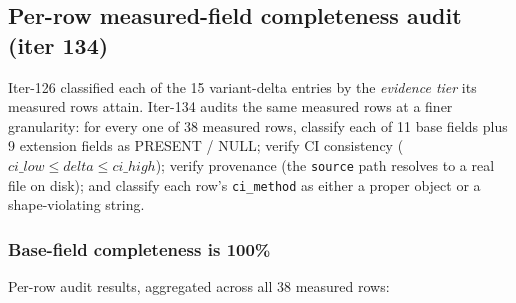 %
%

\subsection{Per-row measured-field completeness audit (iter 134)}
\label{sec:p6-iter134-field-completeness}

Iter-126 classified each of the 15 variant-delta entries by the \emph{evidence
tier} its measured rows attain. Iter-134 audits the same measured rows at a
finer granularity: for every one of 38 measured rows, classify each of 11
base fields plus 9 extension fields as PRESENT / NULL; verify CI consistency
($\mathit{ci\_low} \leq \mathit{delta} \leq \mathit{ci\_high}$); verify
provenance (the \texttt{source} path resolves to a real file on disk); and
classify each row's \texttt{ci\_method} as either a proper object or a
shape-violating string.

\subsubsection{Base-field completeness is 100\%}
\label{sec:p6-iter134-base-fields}

Per-row audit results, aggregated across all 38 measured rows:

